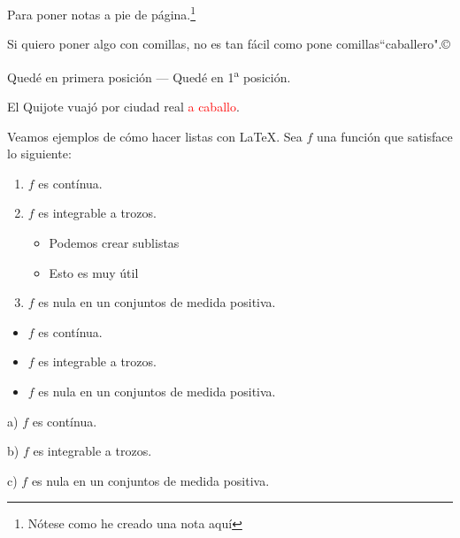 \documentclass{article}
\begin{document}
Para poner notas a pie de página.\footnote{Nótese como he creado una nota aquí}\smallskip

Si quiero poner algo con comillas, no es tan fácil como pone comillas``caballero".\copyright\smallskip 

Quedé en primera posición --- Quedé en 1\textsuperscript{a} posición.\smallskip

El Quijote vuajó por ciudad real \textcolor{red}{a caballo}.\smallskip

Veamos ejemplos de cómo hacer listas con LaTeX. Sea $f$ una función que satisface lo siguiente:
\begin{enumerate}
\item $f$ es contínua.
\item $f$ es integrable a trozos.
\begin{itemize}
\item Podemos crear sublistas
\item Esto es muy útil
	\end{itemize}
\item $f$ es nula en un conjuntos de medida positiva.
\end{enumerate}


\begin{itemize}
\item $f$ es contínua.
\item $f$ es integrable a trozos.
\item $f$ es nula en un conjuntos de medida positiva.
\end{itemize}

\begin{description}
\item{a)} $f$ es contínua.
\item{b)} $f$ es integrable a trozos.
\item{c)} $f$ es nula en un conjuntos de medida positiva.
\end{description}
\end{document}
